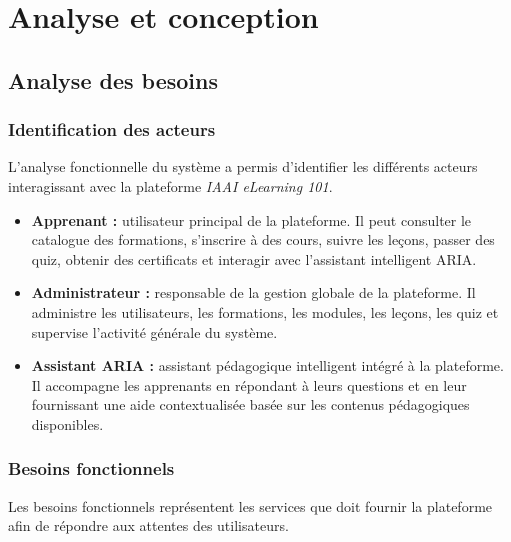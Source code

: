\documentclass[12pt, a4paper]{report}
\begin{document}
\chapter{Analyse et conception}

\section{Analyse des besoins}

\subsection{Identification des acteurs}

L'analyse fonctionnelle du système a permis d'identifier les différents acteurs
interagissant avec la plateforme \textit{IAAI eLearning 101}.

\begin{itemize}
    \item \textbf{Apprenant :} utilisateur principal de la plateforme. Il peut
    consulter le catalogue des formations, s'inscrire à des cours, suivre les
    leçons, passer des quiz, obtenir des certificats et interagir avec
    l'assistant intelligent ARIA.

    \item \textbf{Administrateur :} responsable de la gestion globale de la
    plateforme. Il administre les utilisateurs, les formations, les modules,
    les leçons, les quiz et supervise l'activité générale du système.

    \item \textbf{Assistant ARIA :} assistant pédagogique intelligent intégré à
    la plateforme. Il accompagne les apprenants en répondant à leurs questions
    et en leur fournissant une aide contextualisée basée sur les contenus
    pédagogiques disponibles.
\end{itemize}

\subsection{Besoins fonctionnels}

Les besoins fonctionnels représentent les services que doit fournir la
plateforme afin de répondre aux attentes des utilisateurs.
\end{document}
